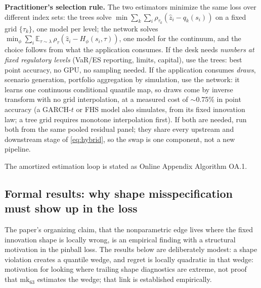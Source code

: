 \documentclass[11pt]{article}
\theoremstyle{remark}
\begin{document}
\noindent\textbf{Practitioner's selection rule.} The two estimators
minimize the same loss over different index sets: the trees solve
$\min \sum_{k}\sum_{i}\rho_{\tau_k}(\widehat{z}_i - q_k(s_i))$ on a
fixed grid $\{\tau_k\}$, one model per level; the network solves
$\min_\phi \sum_i \mathbb{E}_{\tau\sim\lambda}\,
\rho_\tau(\widehat{z}_i - H_\phi(s_i,\tau))$, one model for the continuum, and the choice follows from what the application consumes.
If the desk needs \emph{numbers at fixed regulatory levels} (VaR/ES
reporting, limits, capital), use the trees: best point accuracy, no
GPU, no sampling needed. If the application consumes \emph{draws}, scenario generation, portfolio aggregation by simulation, use the network: it learns one continuous conditional quantile map, so
draws come by inverse transform with no grid interpolation, at a
measured cost of $\sim$0.75\% in point accuracy (a GARCH-$t$ or FHS
model also simulates, from its fixed innovation law; a tree grid
requires monotone interpolation first). If both are needed,
run both from the same pooled residual panel; they share every upstream
and downstream stage of \eqref{eq:hybrid}, so the swap is one component,
not a new pipeline.

\noindent The amortized estimation loop is stated as Online Appendix Algorithm OA.1.

\subsection{Formal results: why shape misspecification must show up in
the loss}\label{sec:theory}

The paper's organizing claim, that the nonparametric edge lives where
the fixed innovation shape is locally wrong, is an empirical finding with a structural motivation in the pinball loss. The results
below are deliberately modest: a shape violation creates a quantile
wedge, and regret is locally quadratic in that wedge: motivation for looking where trailing shape diagnostics are extreme, not proof that
mk$_{63}$ estimates the wedge; that link is established empirically.
\end{document}
